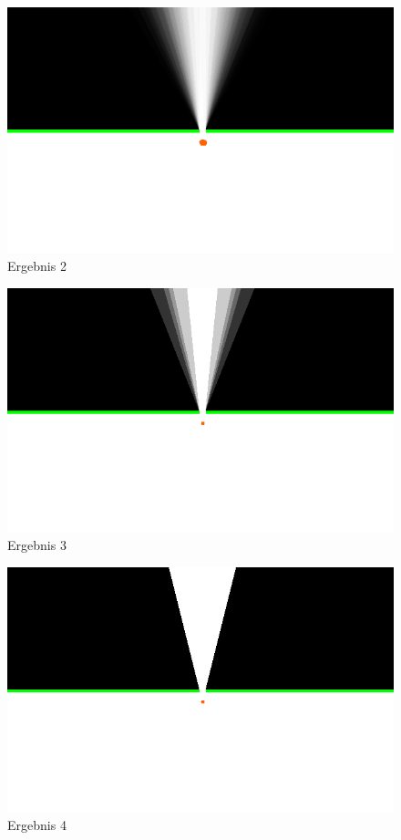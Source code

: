 \documentclass[10pt,twocolumn]{scrartcl}
\begin{document}
\begin{figure}[H]
	\centering
	\includegraphics[width=\columnwidth]{images/ergebnis.png}
	\caption{Ergebnis 2}
	\label{ergeb2}
\end{figure}

\begin{figure}[H]
	\centering
	\includegraphics[width=\columnwidth]{images/ergebnis_2.png}
	\caption{Ergebnis 3}
	\label{ergeb3}
\end{figure}

\begin{figure}[H]
	\centering
	\includegraphics[width=\columnwidth]{images/ergebnis_3.png}
	\caption{Ergebnis 4}
	\label{ergeb4}
\end{figure}
\end{document}
